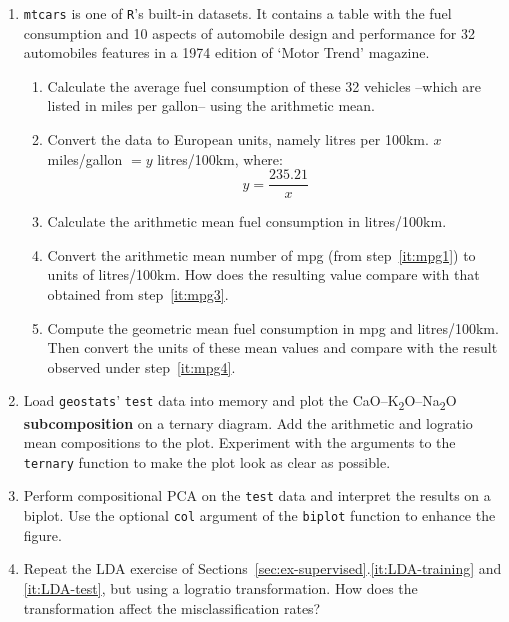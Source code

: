 \begin{enumerate}

\item \texttt{mtcars} is one of \texttt{R}'s built-in datasets. It
  contains a table with the fuel consumption and 10 aspects of
  automobile design and performance for 32 automobiles features in a
  1974 edition of `Motor Trend' magazine.
  \begin{enumerate}
    \item\label{it:mpg1} Calculate the average fuel consumption of
      these 32 vehicles --which are listed in miles per gallon-- using
      the arithmetic mean.
    \item\label{it:mpg2} Convert the data to European units, namely
      litres per 100km. $x$ miles/gallon $= y$ litres/100km,
      where:
      \[
      y = \frac{235.21}{x}
      \]
    \item\label{it:mpg3} Calculate the arithmetic mean fuel
      consumption in litres/100km.
    \item\label{it:mpg4} Convert the arithmetic mean number of mpg
      (from step~\ref{it:mpg1}) to units of litres/100km.  How does
      the resulting value compare with that obtained from
      step~\ref{it:mpg3}.
    \item\label{it:mpg5} Compute the geometric mean fuel consumption
      in mpg and litres/100km. Then convert the units of these mean
      values and compare with the result observed under
      step~\ref{it:mpg4}.
  \end{enumerate}

\item Load \texttt{geostats}' \texttt{test} data into memory and plot
  the CaO--K\textsubscript{2}O--Na\textsubscript{2}O
  \textbf{subcomposition} on a ternary diagram. Add the arithmetic and
  logratio mean compositions to the plot. Experiment with the
  arguments to the \texttt{ternary} function to make the plot look as
  clear as possible.

\item Perform compositional PCA on the \texttt{test} data and
  interpret the results on a biplot. Use the optional \texttt{col}
  argument of the \texttt{biplot} function to enhance the figure.
  
\item Repeat the LDA exercise of
  Sections~\ref{sec:ex-supervised}.\ref{it:LDA-training} and
  \ref{it:LDA-test}, but using a logratio transformation. How does the
  transformation affect the misclassification rates?
  
\end{enumerate}

